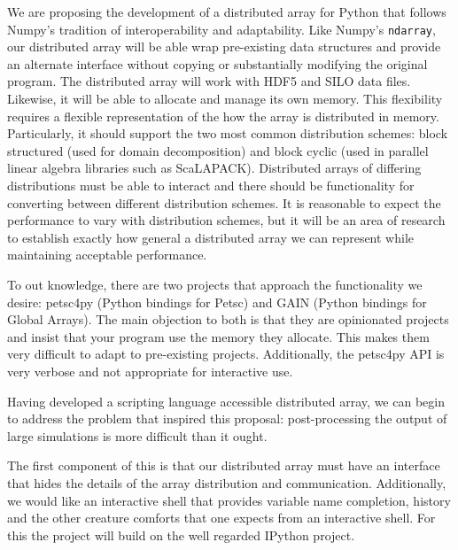 \documentclass[letterpaper,11pt]{article}
\begin{document}
We are proposing the development of a distributed array for Python that follows Numpy's tradition of interoperability and adaptability.  Like Numpy's \texttt{ndarray}, our distributed array will be able wrap pre-existing data structures and provide an alternate interface without copying or substantially modifying the original program.  The distributed array will work with HDF5\cite{HDF5} and SILO data files.  Likewise, it will be able to allocate and manage its own memory.  This flexibility requires a flexible representation of the how the array is distributed in memory.  Particularly, it should support the two most common distribution schemes: block structured (used for domain decomposition) and block cyclic (used in parallel linear algebra libraries such as ScaLAPACK\cite{scalapack}).  Distributed arrays of differing distributions must be able to interact and there should be functionality for converting between different distribution schemes.  It is reasonable to expect the performance to vary with distribution schemes, but it will be an area of research to establish exactly how general a distributed array we can represent while maintaining acceptable performance.

To out knowledge, there are two projects that approach the functionality we desire: petsc4py\cite{petsc4py-web-page} (Python bindings for Petsc\cite{petsc-user-ref}) and GAIN\cite{global-arrays-python} (Python bindings for Global Arrays\cite{global-arrays}).  The main objection to both is that they are opinionated projects and insist that your program use the memory they allocate.  This makes them very difficult to adapt to pre-existing projects.  Additionally, the petsc4py API is very verbose and not appropriate for interactive use.

Having developed a scripting language accessible distributed array, we can begin to address the problem that inspired this proposal: post-processing the output of large simulations is more difficult than it ought.  
  
The first component of this is that our distributed array must have an interface that hides the details of the array distribution and communication.  Additionally, we would like an interactive shell that provides variable name completion, history and the other creature comforts that one expects from an interactive shell.  For this the project will build on the well regarded IPython project.
\end{document}

